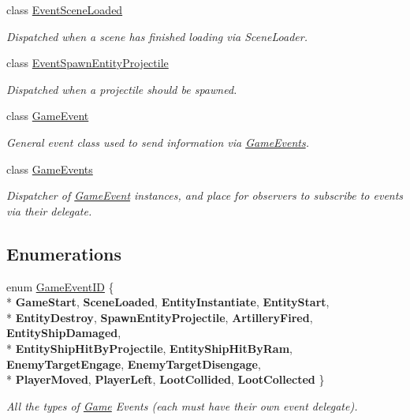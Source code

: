\begin{DoxyCompactItemize}
class \hyperlink{class_skyrates_1_1_client_1_1_game_1_1_event_1_1_event_scene_loaded}{Event\-Scene\-Loaded}
\begin{DoxyCompactList}\small\item\em Dispatched when a scene has finished loading via Scene\-Loader. \end{DoxyCompactList}\item 
class \hyperlink{class_skyrates_1_1_client_1_1_game_1_1_event_1_1_event_spawn_entity_projectile}{Event\-Spawn\-Entity\-Projectile}
\begin{DoxyCompactList}\small\item\em Dispatched when a projectile should be spawned. \end{DoxyCompactList}\item 
class \hyperlink{class_skyrates_1_1_client_1_1_game_1_1_event_1_1_game_event}{Game\-Event}
\begin{DoxyCompactList}\small\item\em General event class used to send information via \hyperlink{class_skyrates_1_1_client_1_1_game_1_1_event_1_1_game_events}{Game\-Events}. \end{DoxyCompactList}\item 
class \hyperlink{class_skyrates_1_1_client_1_1_game_1_1_event_1_1_game_events}{Game\-Events}
\begin{DoxyCompactList}\small\item\em Dispatcher of \hyperlink{class_skyrates_1_1_client_1_1_game_1_1_event_1_1_game_event}{Game\-Event} instances, and place for observers to subscribe to events via their delegate. \end{DoxyCompactList}\end{DoxyCompactItemize}
\subsection*{Enumerations}
\begin{DoxyCompactItemize}
\item 
enum \hyperlink{namespace_skyrates_1_1_client_1_1_game_1_1_event_a3a7e5dc62ad299d5e53abb4a3e5d5088}{Game\-Event\-I\-D} \{ \\*
{\bfseries Game\-Start}, 
{\bfseries Scene\-Loaded}, 
{\bfseries Entity\-Instantiate}, 
{\bfseries Entity\-Start}, 
\\*
{\bfseries Entity\-Destroy}, 
{\bfseries Spawn\-Entity\-Projectile}, 
{\bfseries Artillery\-Fired}, 
{\bfseries Entity\-Ship\-Damaged}, 
\\*
{\bfseries Entity\-Ship\-Hit\-By\-Projectile}, 
{\bfseries Entity\-Ship\-Hit\-By\-Ram}, 
{\bfseries Enemy\-Target\-Engage}, 
{\bfseries Enemy\-Target\-Disengage}, 
\\*
{\bfseries Player\-Moved}, 
{\bfseries Player\-Left}, 
{\bfseries Loot\-Collided}, 
{\bfseries Loot\-Collected}
 \}
\begin{DoxyCompactList}\small\item\em All the types of \hyperlink{class_game}{Game} Events (each must have their own event delegate). \end{DoxyCompactList}\end{DoxyCompactItemize}
